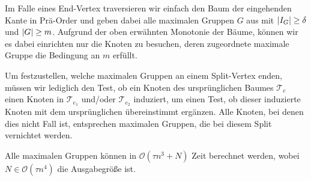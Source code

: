 Im Falle eines End-Vertex traversieren wir einfach den Baum der eingehenden Kante in Prä-Order und geben dabei alle maximalen Gruppen $G$ aus mit $\abs{I_G}\ge \delta$ und $\abs*{G}\ge m$.
Aufgrund der oben erwähnten Monotonie der Bäume, können wir es dabei einrichten nur die Knoten zu besuchen, deren zugeordnete maximale Gruppe die Bedingung an $m$ erfüllt.

Um festzustellen, welche maximalen Gruppen an einem Split-Vertex enden, müssen wir lediglich den Test, ob ein Knoten des ursprünglichen Baumes $\mathcal{T}_e$ einen Knoten in $\mathcal{T}_{e_1}$ und/oder $\mathcal{T}_{e_2}$ induziert, um einen Test, ob dieser induzierte Knoten mit dem ursprünglichen übereinstimmt ergänzen.
Alle Knoten, bei denen dies nicht Fall ist, entsprechen maximalen Gruppen, die bei diesem Split vernichtet werden.

\begin{satz}[{name={\cite[Thm.~9]{buchin2015}}}]
	Alle maximalen Gruppen können in $\mathcal{O}(\tau n^3 + N)$ Zeit berechnet werden, wobei $N \in \mathcal{O}(\tau n^4)$ die Ausgabegröße ist.
\end{satz}



